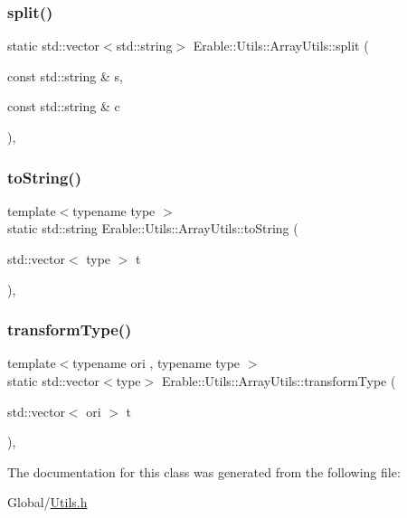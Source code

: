 \mbox{\label{class_erable_1_1_utils_1_1_array_utils_a0480c779e520d62c2acec66d67a103e2}} 
\subsubsection{\texorpdfstring{split()}{split()}}
{\footnotesize\ttfamily static std\+::vector$<$std\+::string$>$ Erable\+::\+Utils\+::\+Array\+Utils\+::split (\begin{DoxyParamCaption}\item[{const std\+::string \&}]{s,  }\item[{const std\+::string \&}]{c }\end{DoxyParamCaption})\hspace{0.3cm}{\ttfamily [inline]}, {\ttfamily [static]}}

\mbox{\label{class_erable_1_1_utils_1_1_array_utils_a0ee1760ed1a3f4e4607df01dcdfffa38}} 
\subsubsection{\texorpdfstring{toString()}{toString()}}
{\footnotesize\ttfamily template$<$typename type $>$ \\
static std\+::string Erable\+::\+Utils\+::\+Array\+Utils\+::to\+String (\begin{DoxyParamCaption}\item[{std\+::vector$<$ type $>$}]{t }\end{DoxyParamCaption})\hspace{0.3cm}{\ttfamily [inline]}, {\ttfamily [static]}}

\mbox{\label{class_erable_1_1_utils_1_1_array_utils_ade18152992f91c71633e2fdbaad9ac7d}} 
\subsubsection{\texorpdfstring{transformType()}{transformType()}}
{\footnotesize\ttfamily template$<$typename ori , typename type $>$ \\
static std\+::vector$<$type$>$ Erable\+::\+Utils\+::\+Array\+Utils\+::transform\+Type (\begin{DoxyParamCaption}\item[{std\+::vector$<$ ori $>$}]{t }\end{DoxyParamCaption})\hspace{0.3cm}{\ttfamily [inline]}, {\ttfamily [static]}}



The documentation for this class was generated from the following file\+:\begin{DoxyCompactItemize}
\item 
Global/\mbox{\hyperlink{_utils_8h}{Utils.\+h}}\end{DoxyCompactItemize}
